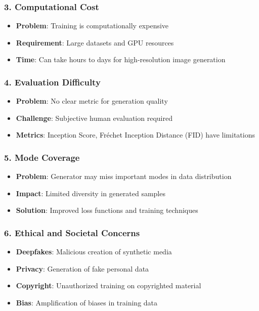 \documentclass[12pt,a4paper]{article}
\begin{document}
\subsubsection{3. Computational Cost}
\begin{itemize}
    \item \textbf{Problem}: Training is computationally expensive
    \item \textbf{Requirement}: Large datasets and GPU resources
    \item \textbf{Time}: Can take hours to days for high-resolution image generation
\end{itemize}

\subsubsection{4. Evaluation Difficulty}
\begin{itemize}
    \item \textbf{Problem}: No clear metric for generation quality
    \item \textbf{Challenge}: Subjective human evaluation required
    \item \textbf{Metrics}: Inception Score, Fréchet Inception Distance (FID) have limitations
\end{itemize}

\subsubsection{5. Mode Coverage}
\begin{itemize}
    \item \textbf{Problem}: Generator may miss important modes in data distribution
    \item \textbf{Impact}: Limited diversity in generated samples
    \item \textbf{Solution}: Improved loss functions and training techniques
\end{itemize}

\subsubsection{6. Ethical and Societal Concerns}
\begin{itemize}
    \item \textbf{Deepfakes}: Malicious creation of synthetic media
    \item \textbf{Privacy}: Generation of fake personal data
    \item \textbf{Copyright}: Unauthorized training on copyrighted material
    \item \textbf{Bias}: Amplification of biases in training data
\end{itemize}
\end{document}
